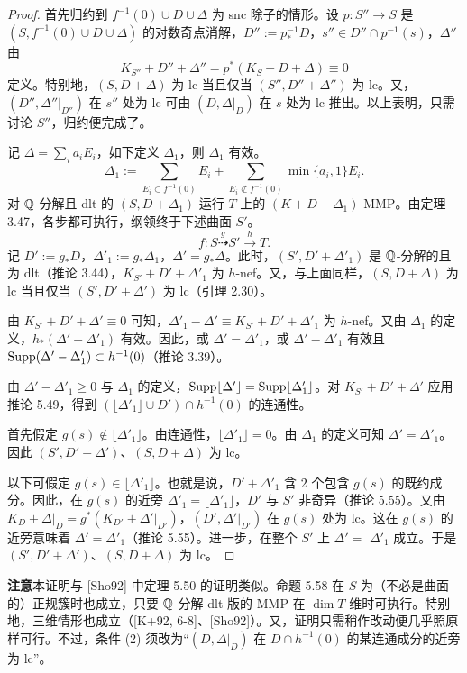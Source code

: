 
\begin{proof}
首先归约到 $f^{-1}(0)\cup D\cup\Delta$ 为 snc 除子的情形。设 $p\colon S''\to S$ 是 $(S,f^{-1}(0)\cup D\cup\Delta)$ 的对数奇点消解，$D'':=p^{-1}_*D$，$s''\in D''\cap p^{-1}(s)$，$\Delta''$ 由
\[
K_{S''}+D''+\Delta''=p^*(K_S+D+\Delta)\equiv0
\]
定义。特别地，$(S,D+\Delta)$ 为 lc 当且仅当 $(S'',D''+\Delta'')$ 为 lc。又，$(D'',\Delta''|_{D''})$ 在 $s''$ 处为 lc 可由 $(D,\Delta|_D)$ 在 $s$ 处为 lc 推出。以上表明，只需讨论 $S''$，归约便完成了。

记 $\Delta=\sum_i a_iE_i$，如下定义 $\Delta_1$，则 $\Delta_1$ 有效。
\[
\Delta_1:=\sum_{E_i\subset f^{-1}(0)}E_i+\sum_{E_i\not\subset f^{-1}(0)}\min\{a_i,1\}E_i.
\]
对 $\mathbb{Q}$-分解且 dlt 的 $(S,D+\Delta_1)$ 运行 $T$ 上的 $(K+D+\Delta_1)$-MMP。由定理 3.47，各步都可执行，纲领终于下述曲面 $S'$。
\[
f\colon S\overset{g}{\dashrightarrow}S'\overset{h}{\to}T.
\]
记 $D':=g_*D$，$\Delta'_1:=g_*\Delta_1$，$\Delta'=g_*\Delta$。此时，$(S',D'+\Delta'_1)$ 是 $\mathbb{Q}$-分解的且为 dlt（推论 3.44），$K_{S'}+D'+\Delta'_1$ 为 $h$-nef。又，与上面同样，$(S,D+\Delta)$ 为 lc 当且仅当 $(S',D'+\Delta')$ 为 lc（引理 2.30）。

由 $K_{S'}+D'+\Delta'\equiv0$ 可知，$\Delta'_1-\Delta'\equiv K_{S'}+D'+\Delta'_1$ 为 $h$-nef。又由 $\Delta_1$ 的定义，$h_*(\Delta'-\Delta'_1)$ 有效。因此，或 $\Delta'=\Delta'_1$，或 $\Delta'-\Delta'_1$ 有效且 $\operatorname{Supp}(\Delta'-\Delta'_1)\subset h^{-1}(0)$（推论 3.39）。

由 $\Delta'-\Delta'_1\ge0$ 与 $\Delta_1$ 的定义，$\operatorname{Supp}\lfloor\Delta'\rfloor=\operatorname{Supp}\lfloor\Delta'_1\rfloor$。对 $K_{S'}+D'+\Delta'$ 应用推论 5.49，得到 $(\lfloor\Delta'_1\rfloor\cup D')\cap h^{-1}(0)$ 的连通性。

首先假定 $g(s)\notin\lfloor\Delta'_1\rfloor$。由连通性，$\lfloor\Delta'_1\rfloor=0$。由 $\Delta_1$ 的定义可知 $\Delta'=\Delta'_1$。因此 $(S',D'+\Delta')$、$(S,D+\Delta)$ 为 lc。

以下可假定 $g(s)\in\lfloor\Delta'_1\rfloor$。也就是说，$D'+\Delta'_1$ 含 $2$ 个包含 $g(s)$ 的既约成分。因此，在 $g(s)$ 的近旁 $\Delta'_1=\lfloor\Delta'_1\rfloor$，$D'$ 与 $S'$ 非奇异（推论 5.55）。又由 $K_D+\Delta|_D=g^*(K_{D'}+\Delta'|_{D'})$，$(D',\Delta'|_{D'})$ 在 $g(s)$ 处为 lc。这在 $g(s)$ 的近旁意味着 $\Delta'=\Delta'_1$（推论 5.55）。进一步，在整个 $S'$ 上 $\Delta'=$
$\Delta'_1$ 成立。于是 $(S',D'+\Delta')$、$(S,D+\Delta)$ 为 lc。
\end{proof}

\par\medskip\noindent\textbf{注意}\quad 本证明与 [Sho92] 中定理 5.50 的证明类似。命题 5.58 在 $S$ 为（不必是曲面的）正规簇时也成立，只要 $\mathbb{Q}$-分解 dlt 版的 MMP 在 $\dim T$ 维时可执行。特别地，三维情形也成立（[K+92, 6-8]、[Sho92]）。又，证明只需稍作改动便几乎照原样可行。不过，条件 (2) 须改为“$(D,\Delta|_D)$ 在 $D\cap h^{-1}(0)$ 的某连通成分的近旁为 lc”。

